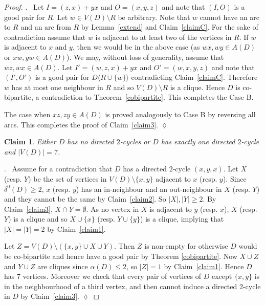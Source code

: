 \documentclass{article}
\newtheorem{claim}{Claim}[theorem]
\theoremstyle{definition}
\newcommand{\induce}[2]{#1\langle #2 \rangle}
\newcommand{\2}{\vspace{0.2cm}}
\newenvironment{subproof}{\par\noindent {\it Proof}.\ }{\hfill$\lozenge$\par\vspace{11pt}}
\begin{document}
\begin{proof}
\begin{subproof}
Let $I=(z,x)+yx$ and $O=(x,y,z)$ and note that $(I,O)$ is a good pair
for $R$.  Let $w \in V(D) \setminus R$ be arbitrary. Note that $w$
cannot have an arc to $R$ and an arc from $R$ by Lemma~\ref{extend}
and Claim~\ref{claimC}. For the sake of contradiction assume that $w$
is adjacent to at least two of the vertices in $R$. If $w$ is adjacent
to $x$ and $y$, then we would be in the above case (as $wx,wy \in
A(D)$ or $xw,yw \in A(D)$). We may, without loss of generality, assume
that $wz,wx \in A(D)$.  Let $I'=(w,z,x) + yx$ and $O'=(w,x,y,z)$ and
note that $(I',O')$ is a good pair for $\induce{D}{R \cup \{w\}}$
contradicting Claim~\ref{claimC}. Therefore $w$ has at most one
neighbour in $R$ and so $V(D)\setminus R$ is a clique.  Hence $D$ is
co-bipartite, a contradiction to Theorem~\ref{cobipartite}. This
completes the Case B.

\2

The case when $xz,zy \in A(D)$ is proved analogously to Case B by
reversing all arcs.  This completes the proof of Claim~\ref{claim3}.
\end{subproof}

\begin{claim}\label{claimNO2C}
Either $D$ has no directed $2$-cycles or $D$ has exactly one directed
$2$-cycle and $|V(D)|=7$.
\end{claim}
\begin{subproof}
Assume for a contradiction that $D$ has a directed $2$-cycle
$(x,y,x)$. Let $X$ (resp. $Y$) be the set of vertices in $V(D)\setminus
\{x,y\}$ adjacent to $x$ (resp. $y$).  Since $\delta^0(D)\geq 2$, $x$
(resp. $y$) has an in-neighbour and an out-neighbour in $X$
(resp. $Y$) and they cannot be the same by Claim~\ref{claim2}.  So
$|X|,|Y|\geq 2$.  By Claim~\ref{claim3}, $X \cap Y = \emptyset$. As no
vertex in $X$ is adjacent to $y$ (resp. $x$), $X$ (resp. $Y$) is a
clique and so $X\cup \{x\}$ (resp. $Y\cup\{y\}$) is a clique, implying
that $|X|=|Y|=2$ by Claim~\ref{claim1}.

Let $Z=V(D)\setminus (\{x,y\}\cup X\cup Y)$.  Then $Z$ is non-empty
for otherwise $D$ would be co-bipartite and hence have a good pair by
Theorem \ref{cobipartite}.  Now $X\cup Z$ and $Y\cup Z$ are cliques
since $\alpha(D)\leq 2$, so $|Z|=1$ by Claim~\ref{claim1}.  Hence $D$
has 7 vertices. Moreover we check that every pair of vertices of
  $D$ except $\{x,y\}$ is in the neighbourhood of a third vertex, and
  then cannot induce a directed 2-cycle in $D$ by Claim~\ref{claim3}.
\end{subproof}




\end{proof}
\end{document}
